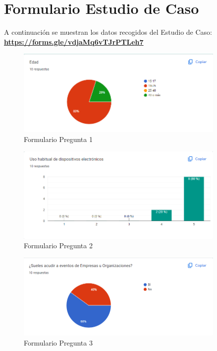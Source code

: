 \section{Formulario Estudio de Caso}
\label{sec:apen1}
A continuación se muestran los datos recogidos del Estudio de Caso: 
\textbf{\href{https://forms.gle/vdjaMq6vTJrPTLeh7}{https://forms.gle/vdjaMq6vTJrPTLeh7}}

\begin{figure}[h]
    \centering
    \includegraphics[width=0.9\textwidth]{Form1.png} 
    \caption{Formulario Pregunta 1}
    \label{fig:form1}
\end{figure}
\begin{figure}[h]
    \centering
    \includegraphics[width=0.9\textwidth]{Form2.png} 
    \caption{Formulario Pregunta 2}
    \label{fig:form2}
\end{figure} 
\begin{figure}[h]
    \centering
    \includegraphics[width=0.9\textwidth]{Form3.png} 
    \caption{Formulario Pregunta 3}
    \label{fig:form3}
\end{figure}
